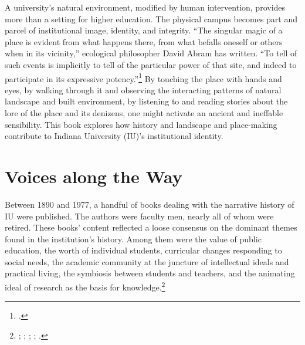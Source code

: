 \documentclass[
  american,
  letterpaper,
]{scrreprt}
\begin{document}
A university's natural environment, modified by human intervention,
provides more than a setting for higher education. The physical campus
becomes part and parcel of institutional image, identity, and integrity.
``The singular magic of a place is evident from what happens there, from
what befalls oneself or others when in its vicinity,'' ecological
philosopher David Abram has written. ``To tell of such events is
implicitly to tell of the particular power of that site, and indeed to
participate in its expressive potency.''\footnote{.} By touching
the place with hands and eyes, by walking through it and observing the
interacting patterns of natural landscape and built environment, by
listening to and reading stories about the lore of the place and its
denizens, one might activate an ancient and ineffable sensibility. This
book explores how history and landscape and place-making contribute to
Indiana University (IU)'s institutional identity.

\section*{Voices along the Way}\label{voices-along-the-way}


Between 1890 and 1977, a handful of books dealing with the narrative
history of IU were published. The authors were faculty men, nearly all
of whom were retired. These books' content reflected a loose consensus
on the dominant themes found in the institution's history. Among them
were the value of public education, the worth of individual students,
curricular changes responding to social needs, the academic community at
the juncture of intellectual ideals and practical living, the symbiosis
between students and teachers, and the animating ideal of research as
the basis for knowledge.\footnote{;
  ; ;
  ; .}
\end{document}

